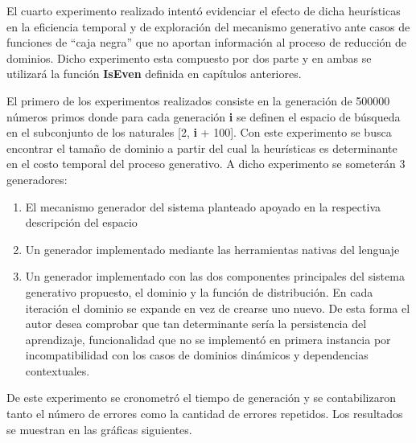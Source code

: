 El cuarto experimento realizado intentó evidenciar el efecto de dicha heurísticas en la eficiencia temporal
y de exploración del mecanismo generativo ante casos de funciones de ``caja negra'' que no aportan información
al proceso de reducción de dominios. Dicho experimento esta compuesto por dos parte y en ambas se utilizará
la función {\bf IsEven} definida en capítulos anteriores.

El primero de los experimentos realizados consiste en la generación de 500000 números primos donde para cada
generación {\bf i} se definen el espacio de búsqueda en el subconjunto de los naturales [2, {\bf i} + 100]. Con este
experimento se busca encontrar el tamaño de dominio a partir del cual la heurísticas es determinante en el
costo temporal del proceso generativo. A dicho experimento se someterán 3 generadores:
\begin{enumerate}

      \item  El mecanismo generador del sistema planteado apoyado en la respectiva descripción del espacio
      \item  Un generador implementado mediante las herramientas nativas del lenguaje
      \item  Un generador implementado con las dos componentes principales del sistema generativo propuesto, el
            dominio y la función de distribución. En cada iteración el dominio se expande en vez
            de crearse uno nuevo. De esta forma el autor desea comprobar que tan determinante sería la persistencia del
            aprendizaje, funcionalidad que no se implementó en primera instancia por incompatibilidad con los casos de
            dominios dinámicos y dependencias contextuales.
\end{enumerate}

De este experimento se cronometró el tiempo de generación y se contabilizaron tanto el número de errores como la
cantidad de errores repetidos. Los resultados se muestran en las gráficas siguientes.

